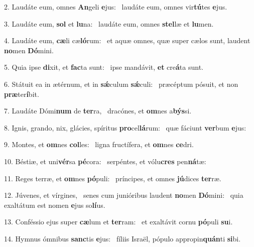2. Laudáte eum, omnes \textbf{An}geli \textbf{e}jus: \ast\  laudáte eum, omnes vir\textbf{tú}tes \textbf{e}jus.\

3. Laudáte eum, \textbf{sol} et \textbf{lu}na: \ast\  laudáte eum, omnes \textbf{stel}læ et \textbf{lu}men.\

4. Laudáte eum, \textbf{cæ}li cæ\textbf{ló}rum: \ast\  et aquæ omnes, quæ super cælos sunt, laudent \textbf{no}men \textbf{Dó}mini.\

5. Quia ipse \textbf{di}xit, et \textbf{fac}ta sunt: \ast\  ipse mandávit, \textbf{et} cre\textbf{á}ta sunt.\

6. Státuit ea in ætérnum, et in \textbf{sǽ}culum \textbf{sǽ}culi: \ast\  præcéptum pósuit, et non \textbf{præ}ter\textbf{í}bit.\

7. Laudáte Dómi\textbf{num} de \textbf{ter}ra, \ast\  dracónes, et \textbf{om}nes a\textbf{býs}si.\

8. Ignis, grando, nix, glácies, spíritus \textbf{pro}cel\textbf{lá}rum: \ast\  quæ fáciunt \textbf{ver}bum \textbf{e}jus:\

9. Montes, et \textbf{om}nes \textbf{col}les: \ast\  ligna fructífera, et \textbf{om}nes \textbf{ce}dri.\

10. Béstiæ, et uni\textbf{vér}sa \textbf{pé}cora: \ast\  serpéntes, et vólu\textbf{cres} pen\textbf{ná}tæ:\

11. Reges terræ, et \textbf{om}nes \textbf{pó}puli: \ast\  príncipes, et omnes \textbf{jú}dices \textbf{ter}ræ.\

12. Júvenes, et vírgines, \dag\  senes cum junióribus laudent \textbf{no}men \textbf{Dó}mini: \ast\  quia exaltátum est nomen \textbf{e}jus so\textbf{lí}us.\

13. Conféssio ejus super \textbf{cæ}lum et \textbf{ter}ram: \ast\  et exaltávit cornu \textbf{pó}puli \textbf{su}i.\

14. Hymnus ómnibus \textbf{sanc}tis \textbf{e}jus: \ast\  fíliis Israël, pópulo appropin\textbf{quán}ti \textbf{si}bi.\

